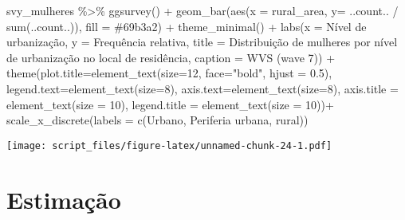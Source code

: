 \documentclass[
]{article}
\newenvironment{Shaded}{\begin{snugshade}}{\end{snugshade}}
\newcommand{\AttributeTok}[1]{\textcolor[rgb]{0.77,0.63,0.00}{#1}}
\newcommand{\DecValTok}[1]{\textcolor[rgb]{0.00,0.00,0.81}{#1}}
\newcommand{\FloatTok}[1]{\textcolor[rgb]{0.00,0.00,0.81}{#1}}
\newcommand{\FunctionTok}[1]{\textcolor[rgb]{0.00,0.00,0.00}{#1}}
\newcommand{\NormalTok}[1]{#1}
\newcommand{\SpecialCharTok}[1]{\textcolor[rgb]{0.00,0.00,0.00}{#1}}
\newcommand{\StringTok}[1]{\textcolor[rgb]{0.31,0.60,0.02}{#1}}
\begin{document}
\begin{Shaded}
\begin{Highlighting}[]
\NormalTok{svy\_mulheres }\SpecialCharTok{\%\textgreater{}\%}
  \FunctionTok{ggsurvey}\NormalTok{() }\SpecialCharTok{+}
  \FunctionTok{geom\_bar}\NormalTok{(}\FunctionTok{aes}\NormalTok{(}\AttributeTok{x =}\NormalTok{ rural\_area, }\AttributeTok{y=}\NormalTok{ ..count.. }\SpecialCharTok{/} \FunctionTok{sum}\NormalTok{(..count..)), }\AttributeTok{fill =} \StringTok{\textquotesingle{}\#69b3a2\textquotesingle{}}\NormalTok{) }\SpecialCharTok{+}
  \FunctionTok{theme\_minimal}\NormalTok{() }\SpecialCharTok{+}
  \FunctionTok{labs}\NormalTok{(}\AttributeTok{x =} \StringTok{\textquotesingle{}Nível de urbanização\textquotesingle{}}\NormalTok{,}
       \AttributeTok{y =} \StringTok{\textquotesingle{}Frequência relativa\textquotesingle{}}\NormalTok{,}
       \AttributeTok{title =} \StringTok{\textquotesingle{}Distribuição de mulheres por nível de urbanização no local de residência\textquotesingle{}}\NormalTok{,}
       \AttributeTok{caption =} \StringTok{\textquotesingle{}WVS (wave 7)\textquotesingle{}}\NormalTok{) }\SpecialCharTok{+}
  \FunctionTok{theme}\NormalTok{(}\AttributeTok{plot.title=}\FunctionTok{element\_text}\NormalTok{(}\AttributeTok{size=}\DecValTok{12}\NormalTok{, }\AttributeTok{face=}\StringTok{"bold"}\NormalTok{, }\AttributeTok{hjust =} \FloatTok{0.5}\NormalTok{),}
        \AttributeTok{legend.text=}\FunctionTok{element\_text}\NormalTok{(}\AttributeTok{size=}\DecValTok{8}\NormalTok{),}
        \AttributeTok{axis.text=}\FunctionTok{element\_text}\NormalTok{(}\AttributeTok{size=}\DecValTok{8}\NormalTok{),}
        \AttributeTok{axis.title =} \FunctionTok{element\_text}\NormalTok{(}\AttributeTok{size =} \DecValTok{10}\NormalTok{),}
        \AttributeTok{legend.title =} \FunctionTok{element\_text}\NormalTok{(}\AttributeTok{size =} \DecValTok{10}\NormalTok{))}\SpecialCharTok{+}
  \FunctionTok{scale\_x\_discrete}\NormalTok{(}\AttributeTok{labels =} \FunctionTok{c}\NormalTok{(}\StringTok{\textquotesingle{}Urbano\textquotesingle{}}\NormalTok{, }\StringTok{\textquotesingle{}Periferia urbana\textquotesingle{}}\NormalTok{, }\StringTok{\textquotesingle{}rural\textquotesingle{}}\NormalTok{))}
\end{Highlighting}
\end{Shaded}

\texttt{[image: script\_files/figure-latex/unnamed-chunk-24-1.pdf]}

\hypertarget{estimauxe7uxe3o}{%
\section{Estimação}\label{estimauxe7uxe3o}}
\end{document}
